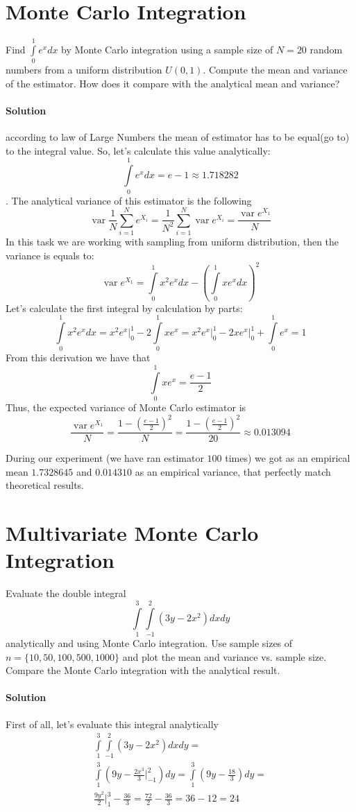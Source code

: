 \documentclass[a4paper, 12pt]{article}
\DeclareMathOperator{\var}{var}
\newcommand{\rbra}[1]{\left( #1 \right)}
\newcommand{\sol}{
    \paragraph{Solution}
}
\begin{document}
\section{Monte Carlo Integration}
Find $\int\limits_0^1 e^x dx$ by Monte Carlo integration using a
sample size of $N = 20$ random numbers from a uniform
distribution $U (0, 1)$. Compute the mean and variance of the estimator.
How does it compare with the analytical mean and variance?

\sol according to law of Large Numbers the mean of estimator
has to be equal(go to) to the integral value. So, let's calculate
this value analytically:
\[
    \int\limits_0^{1} e^x dx = e - 1 \approx 1.718282
\].
The analytical variance of this estimator is the following
\[
    \var \frac{1}{N} \sum\limits_{i=1}^{N} e^{X_i} =
    \frac{1}{N^2} \sum\limits_{i=1}^{N} \var e^{X_i} =
    \frac{\var e^{X_1}}{N}
\]
In this task we are working with sampling from uniform distribution, then
the variance is equals to:
\[
    \var e^{X_1} = \int\limits_{0}^{1} x^2e^x dx -
    \rbra{\int\limits_{0}^{1} xe^x dx}^2
\]
Let's calculate the first integral by calculation by parts:
\[
    \int\limits_{0}^{1} x^2e^x dx = x^2 e^x \Big|_0^1 - 2 \int\limits_0^1 x e^x =
    x^2 e^x \Big|_0^1 - 2xe^x \Big|_0^1 + \int\limits_0^1 e^x = 1
\]
From this derivation we have that
\[
    \int\limits_0^1 x e^x = \frac{e - 1}{2}
\]
Thus, the expected variance of Monte Carlo estimator is
\[
    \frac{\var e^{X_1}}{N} =
    \dfrac{1 - \rbra{\frac{e - 1}{2}}^2}{N} =
    \dfrac{1 - \rbra{\frac{e - 1}{2}}^2}{20} \approx
    0.013094
\]

During our experiment (we have ran estimator $100$ times)
we got as an empirical mean $ 1.7328645 $ and $0.014310$
as an empirical variance, that perfectly match
theoretical results.

\section{Multivariate Monte Carlo Integration}
Evaluate the double integral
\[
    \int\limits_1^3 \int\limits_{-1}^2 (3y - 2x^2) dx dy
\]
analytically and using Monte Carlo integration.
Use sample sizes of $n = \{10, 50, 100, 500, 1000 \}$
and plot the mean and variance vs. sample size.
Compare the Monte Carlo integration with the analytical result.

\sol

First of all, let's evaluate this integral analytically
\begin{multline*}
    \int\limits_1^3 \int\limits_{-1}^2 (3y - 2x^2) dx dy = \\
    \int\limits_1^3 \rbra{9y - \frac{2x^3}{3} \Bigg|^{2}_{-1}} dy =
    \int\limits_1^3 \rbra{9y - \frac{18}{3}} dy = \\
    \frac{9y^2}{2} \Bigg|^{3}_{1} - \frac{36}{3} =
    \frac{72}{2} - \frac{36}{3} = 36 - 12 = 24
\end{multline*}
\end{document}
